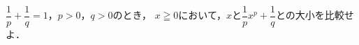 \documentclass[../../main.tex]{subfiles}
\begin{document}
$\displaystyle\dfrac{1}{p}+\dfrac{1}{q}=1$，$p>0$，$q>0$のとき，
$x\geqq0$において，$x$と$\displaystyle\dfrac{1}{p}x^p+\dfrac{1}{q}$との大小を比較せよ．
\end{document}
